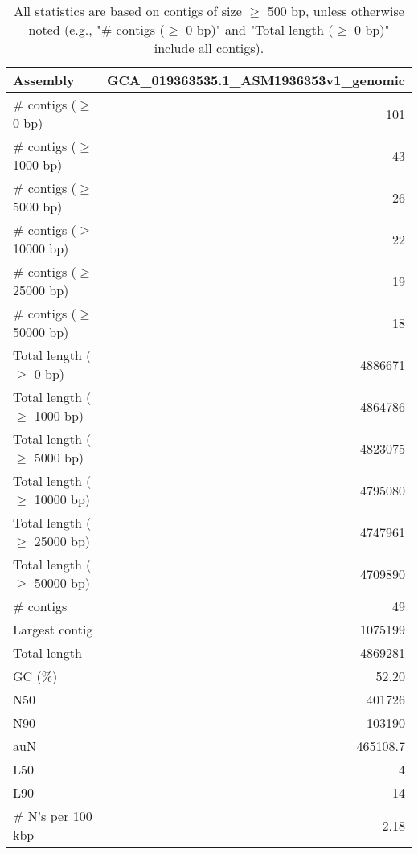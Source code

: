 \documentclass[12pt,a4paper]{article}
\begin{document}
\begin{table}[ht]
\begin{center}
\caption{All statistics are based on contigs of size $\geq$ 500 bp, unless otherwise noted (e.g., "\# contigs ($\geq$ 0 bp)" and "Total length ($\geq$ 0 bp)" include all contigs).}
\begin{tabular}{|l*{1}{|r}|}
\hline
Assembly & GCA\_019363535.1\_ASM1936353v1\_genomic \\ \hline
\# contigs ($\geq$ 0 bp) & 101 \\ \hline
\# contigs ($\geq$ 1000 bp) & 43 \\ \hline
\# contigs ($\geq$ 5000 bp) & 26 \\ \hline
\# contigs ($\geq$ 10000 bp) & 22 \\ \hline
\# contigs ($\geq$ 25000 bp) & 19 \\ \hline
\# contigs ($\geq$ 50000 bp) & 18 \\ \hline
Total length ($\geq$ 0 bp) & 4886671 \\ \hline
Total length ($\geq$ 1000 bp) & 4864786 \\ \hline
Total length ($\geq$ 5000 bp) & 4823075 \\ \hline
Total length ($\geq$ 10000 bp) & 4795080 \\ \hline
Total length ($\geq$ 25000 bp) & 4747961 \\ \hline
Total length ($\geq$ 50000 bp) & 4709890 \\ \hline
\# contigs & 49 \\ \hline
Largest contig & 1075199 \\ \hline
Total length & 4869281 \\ \hline
GC (\%) & 52.20 \\ \hline
N50 & 401726 \\ \hline
N90 & 103190 \\ \hline
auN & 465108.7 \\ \hline
L50 & 4 \\ \hline
L90 & 14 \\ \hline
\# N's per 100 kbp & 2.18 \\ \hline
\end{tabular}
\end{center}
\end{table}
\end{document}
